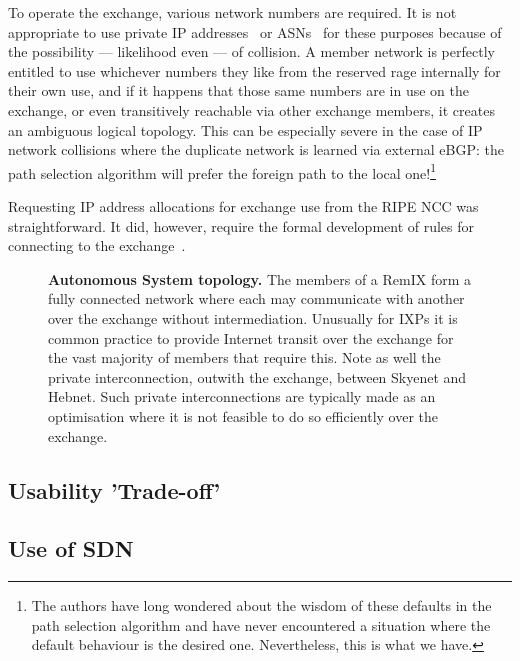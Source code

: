 To operate the exchange, various network numbers are required. It is
not appropriate to use private IP addresses~\cite{rfc1918}
or \acp{ASN}~\cite{rfc6996} for these purposes because of the
possibility --- likelihood even --- of collision. A member network is
perfectly entitled to use whichever numbers they like from the
reserved rage internally for their own use, and if it happens that
those same numbers are in use on the exchange, or even transitively
reachable via other exchange members, it creates an ambiguous logical
topology. This can be especially severe in the case of IP network
collisions where the duplicate network is learned via external eBGP:
the path selection algorithm will prefer the foreign path to the local
one!\footnote{The authors have long wondered about the wisdom of these
defaults in the path selection algorithm and have never encountered a
situation where the default behaviour is the desired
one. Nevertheless, this is what we have.}

Requesting IP address allocations for exchange use from the RIPE NCC
was straightforward. It did, however, require the formal development
of rules for connecting to the exchange~\cite{whixrules}. 


\begin{figure}[h]
  \resizebox{\linewidth}{!}{
    \begin{tikzpicture}
      \whixtopodiagram
    \end{tikzpicture}
  }
  \caption{
  \textbf{Autonomous System topology.} The members of a RemIX form a fully connected network where each may communicate
  with another over the exchange without intermediation. Unusually for \acp{IXP} it is common practice to provide Internet transit over the exchange for the vast majority of members that require this. Note as
  well the private interconnection, outwith the exchange, between Skyenet 
  and Hebnet. Such private interconnections are typically made as
  an optimisation where it is not feasible to do so efficiently over the exchange. 
  }
\end{figure}



\subsection{Usability 'Trade-off'} \label{subsec:use}


\subsection{Use of SDN}


